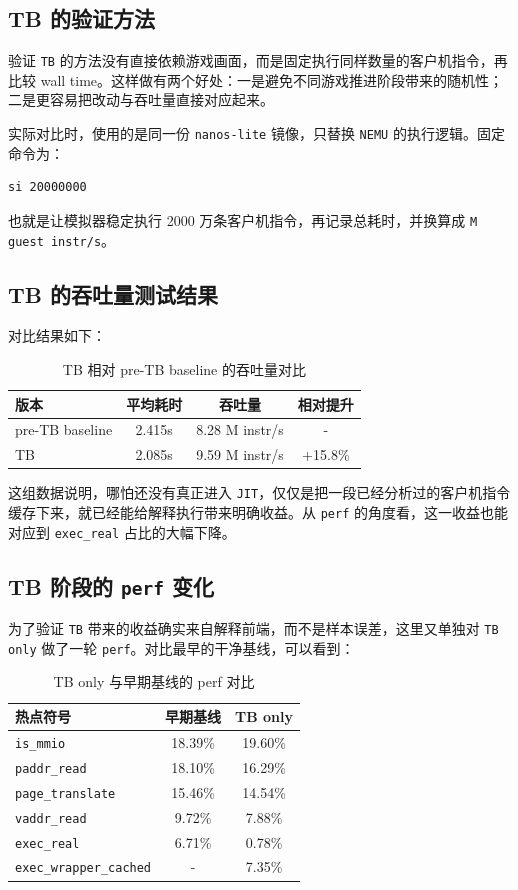 \documentclass[a4paper]{article}
\begin{document}
\subsection{TB 的验证方法}
验证 \texttt{TB} 的方法没有直接依赖游戏画面，而是固定执行同样数量的客户机指令，再比较 wall time。这样做有两个好处：一是避免不同游戏推进阶段带来的随机性；二是更容易把改动与吞吐量直接对应起来。

实际对比时，使用的是同一份 \texttt{nanos-lite} 镜像，只替换 \texttt{NEMU} 的执行逻辑。固定命令为：

\begin{lstlisting}[language=bash]
si 20000000
\end{lstlisting}

也就是让模拟器稳定执行 2000 万条客户机指令，再记录总耗时，并换算成 \texttt{M guest instr/s}。

\subsection{TB 的吞吐量测试结果}
对比结果如下：

\begin{table}[H]
  \centering
  \begin{tabular}{lccc}
    \toprule
    版本 & 平均耗时 & 吞吐量 & 相对提升 \\
    \midrule
    pre-TB baseline & 2.415s & 8.28 M instr/s & - \\
    TB & 2.085s & 9.59 M instr/s & +15.8\% \\
    \bottomrule
  \end{tabular}
  \caption{TB 相对 pre-TB baseline 的吞吐量对比}
\end{table}

这组数据说明，哪怕还没有真正进入 \texttt{JIT}，仅仅是把一段已经分析过的客户机指令缓存下来，就已经能给解释执行带来明确收益。从 \texttt{perf} 的角度看，这一收益也能对应到 \texttt{exec\_real} 占比的大幅下降。

\subsection{TB 阶段的 \texttt{perf} 变化}
为了验证 \texttt{TB} 带来的收益确实来自解释前端，而不是样本误差，这里又单独对 \texttt{TB only} 做了一轮 \texttt{perf}。对比最早的干净基线，可以看到：

\begin{table}[H]
  \centering
  \begin{tabular}{lcc}
    \toprule
    热点符号 & 早期基线 & TB only \\
    \midrule
    \texttt{is\_mmio} & 18.39\% & 19.60\% \\
    \texttt{paddr\_read} & 18.10\% & 16.29\% \\
    \texttt{page\_translate} & 15.46\% & 14.54\% \\
    \texttt{vaddr\_read} & 9.72\% & 7.88\% \\
    \texttt{exec\_real} & 6.71\% & 0.78\% \\
    \texttt{exec\_wrapper\_cached} & - & 7.35\% \\
    \bottomrule
  \end{tabular}
  \caption{TB only 与早期基线的 perf 对比}
\end{table}
\end{document}
